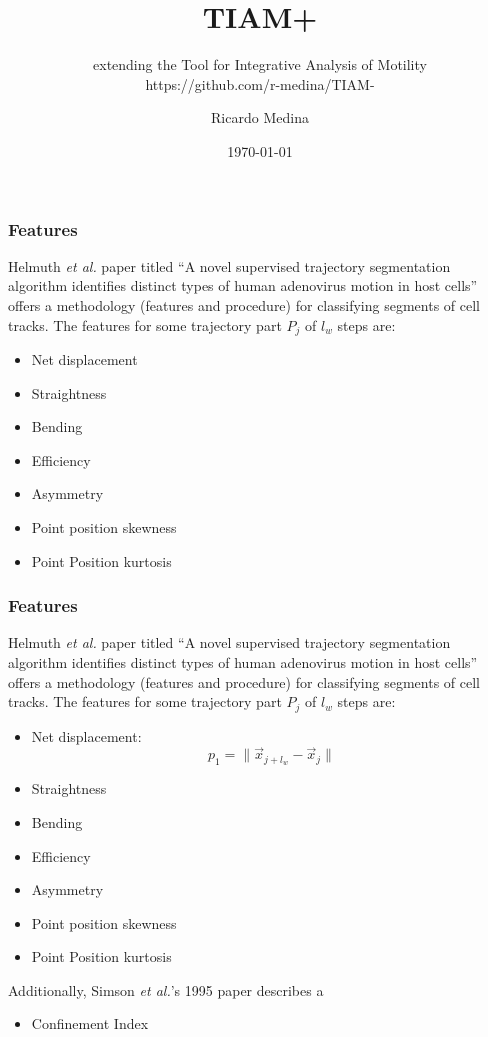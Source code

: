 \documentclass[8pt]{beamer}
\begin{document}
\title{TIAM+}
\subtitle{extending the Tool for Integrative Analysis of Motility\\ https://github.com/r-medina/TIAM-}
\author{Ricardo Medina}
\date{\today}


\frame{\titlepage}


\begin{frame}
  \frametitle{Features}
  Helmuth \emph{et al.} paper titled ``A novel supervised trajectory
  segmentation algorithm identifies distinct types of human adenovirus
  motion in host cells'' offers a methodology (features and procedure)
  for classifying segments of cell tracks.
  The features for some trajectory part $P_j$ of $l_w$ steps are:
  \begin{itemize}
  \item Net displacement
  \item Straightness
  \item Bending
  \item Efficiency
  \item Asymmetry
  \item Point position skewness
  \item Point Position kurtosis
  \end{itemize}
\end{frame}

\begin{frame}
  \frametitle{Features}
  Helmuth \emph{et al.} paper titled ``A novel supervised trajectory
  segmentation algorithm identifies distinct types of human adenovirus
  motion in host cells'' offers a methodology (features and procedure)
  for classifying segments of cell tracks.
  The features for some trajectory part $P_j$ of $l_w$ steps are:
  \begin{itemize}
  \item Net displacement: 
    \begin{equation*}
      p_1 = \| \vec{x}_{j+l_w} - \vec{x}_j \|
    \end{equation*}
  \item Straightness
  \item Bending
  \item Efficiency
  \item Asymmetry
  \item Point position skewness
  \item Point Position kurtosis
  \end{itemize}
  Additionally, Simson \emph{et al.}'s 1995 paper describes a 
  \begin{itemize}
  \item Confinement Index
  \end{itemize}
\end{frame}
\end{document}
